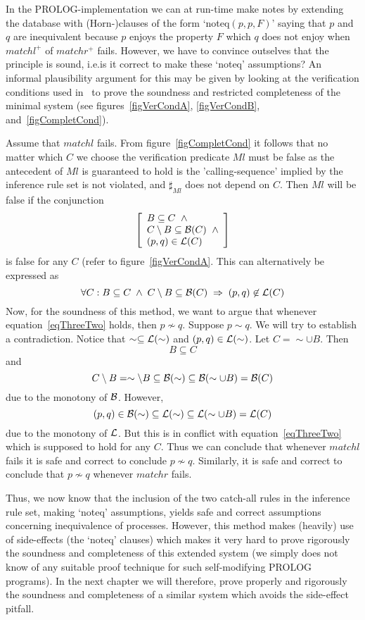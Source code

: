 In the PROLOG-implementation we can at run-time make notes by extending the database with (Horn-)clauses of the form `noteq$(p,p,F)$' saying that $p$ and $q$ are inequivalent because $p$ enjoys the property $F$ which $q$ does not enjoy when $matchl^{+}$ of $matchr^{+}$ fails. However, we have to convince outselves that the principle is sound, i.e.\@ is it correct to make these `noteq' assumptions? An informal plausibility argument for this may be given by looking at the verification conditions used in~\cite{Larsen} to prove the soundness and restricted completeness of the minimal system (see figures~\ref{figVerCondA}, \ref{figVerCondB}, and~\ref{figCompletCond}).

Assume that $matchl$ fails. From figure~\ref{figCompletCond} it follows that no matter which $C$ we choose the verification predicate $Ml$ must be false as the antecedent of $Ml$ is guaranteed to hold is the 'calling-sequence' implied by the inference rule set is not violated, and $\sharp_{Ml}$ does not depend on $C$. Then $Ml$ will be false if the conjunction
\[
\left[\begin{array}{l}
B\subseteq C\;\;\wedge\\
C\setminus B\subseteq {\cal B}(C)\;\;\wedge\\
(p,q)\in {\cal L}(C)
\end{array}\right]
\]
is false for any $C$ (refer to figure~\ref{figVerCondA}. This can alternatively be expressed as
\begin{equation}\label{eqThreeTwo}
\forall C: B\subseteq C\; \wedge\; C\setminus B\subseteq {\cal B}(C)\;\Rightarrow\; (p,q)\not\in{\cal L}(C)
\end{equation}
Now, for the soundness of this method, we want to argue that whenever equation~\ref{eqThreeTwo} holds, then $p\not\sim q$. Suppose $p\sim q$. We will try to establish a contradiction. Notice that $\sim\subseteq{\cal L}(\sim)$ and $(p,q)\in{\cal L}(\sim)$. Let $C=\sim\cup B$. Then
\[
B\subseteq C
\]
and
\[
C\setminus B = \sim \setminus B\subseteq {\cal B}(\sim)\subseteq {\cal B}(\sim \cup B) = {\cal B}(C)
\]
due to the monotony of $\cal B$. However,
\[
(p,q)\in {\cal B}(\sim) \subseteq {\cal L}(\sim) \subseteq {\cal L}(\sim\cup B) = {\cal L}(C)
\]
due to the monotony of $\cal L$. But this is in conflict with equation~\ref{eqThreeTwo} which is supposed to hold for any $C$. Thus we can conclude that whenever $matchl$ fails it is safe and correct to conclude $p\not\sim q$. Similarly, it is safe and correct to conclude that $p\not\sim q$ whenever $matchr$ fails.

Thus, we now know that the inclusion of the two catch-all rules in the inference rule set, making `noteq' assumptions, yields safe and correct assumptions concerning inequivalence of processes. However, this method makes (heavily) use of side-effects (the `noteq' clauses) which makes it very hard to prove rigorously the soundness and completeness of this extended system (we simply does not know of any suitable proof technique for such self-modifying PROLOG programs). In the next chapter we will therefore, prove properly and rigorously the soundness and completeness of a similar system which avoids the side-effect pitfall.


